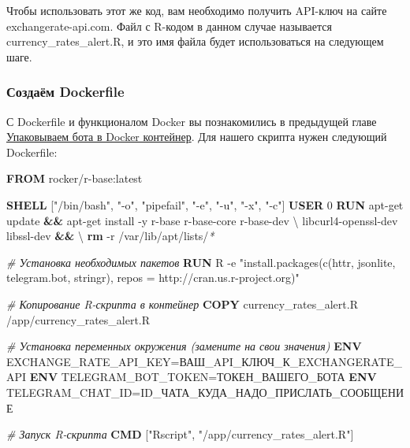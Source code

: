 \documentclass[
]{book}
\newenvironment{Shaded}{\begin{snugshade}}{\end{snugshade}}
\newcommand{\AttributeTok}[1]{\textcolor[rgb]{0.13,0.29,0.53}{#1}}
\newcommand{\CommentTok}[1]{\textcolor[rgb]{0.56,0.35,0.01}{\textit{#1}}}
\newcommand{\DataTypeTok}[1]{\textcolor[rgb]{0.13,0.29,0.53}{#1}}
\newcommand{\ExtensionTok}[1]{#1}
\newcommand{\FunctionTok}[1]{\textcolor[rgb]{0.13,0.29,0.53}{\textbf{#1}}}
\newcommand{\KeywordTok}[1]{\textcolor[rgb]{0.13,0.29,0.53}{\textbf{#1}}}
\newcommand{\NormalTok}[1]{#1}
\newcommand{\PreprocessorTok}[1]{\textcolor[rgb]{0.56,0.35,0.01}{\textit{#1}}}
\newcommand{\StringTok}[1]{\textcolor[rgb]{0.31,0.60,0.02}{#1}}
\begin{document}
Чтобы использовать этот же код, вам необходимо получить API-ключ на сайте exchangerate-api.com. Файл с R-кодом в данном случае называется currency\_rates\_alert.R, и это имя файла будет использоваться на следующем шаге.

\subsubsection{Создаём Dockerfile}\label{ux441ux43eux437ux434ux430ux451ux43c-dockerfile}

С Dockerfile и функционалом Docker вы познакомились в предыдущей главе \hyperref[ux443ux43fux430ux43aux43eux432ux44bux432ux430ux435ux43c-ux431ux43eux442ux430-ux432-docker-ux43aux43eux43dux442ux435ux439ux43dux435ux440]{Упаковываем бота в Docker контейнер}. Для нашего скрипта нужен следующий Dockerfile:

\begin{Shaded}
\begin{Highlighting}[]
\KeywordTok{FROM}\NormalTok{ rocker/r{-}base:latest}

\KeywordTok{SHELL}\NormalTok{ [}\StringTok{"/bin/bash"}\NormalTok{, }\StringTok{"{-}o"}\NormalTok{, }\StringTok{"pipefail"}\NormalTok{, }\StringTok{"{-}e"}\NormalTok{, }\StringTok{"{-}u"}\NormalTok{, }\StringTok{"{-}x"}\NormalTok{, }\StringTok{"{-}c"}\NormalTok{]}
\KeywordTok{USER}\NormalTok{ 0}
\KeywordTok{RUN} \ExtensionTok{apt{-}get}\NormalTok{ update }\KeywordTok{\&\&} \ExtensionTok{apt{-}get}\NormalTok{ install }\AttributeTok{{-}y}\NormalTok{ r{-}base r{-}base{-}core r{-}base{-}dev }\DataTypeTok{\textbackslash{}}
\NormalTok{    libcurl4{-}openssl{-}dev libssl{-}dev }\KeywordTok{\&\&} \DataTypeTok{\textbackslash{}}
    \FunctionTok{rm} \AttributeTok{{-}r}\NormalTok{ /var/lib/apt/lists/}\PreprocessorTok{*}

\CommentTok{\# Установка необходимых пакетов}
\KeywordTok{RUN} \ExtensionTok{R} \AttributeTok{{-}e} \StringTok{"install.packages(c(\textquotesingle{}httr\textquotesingle{}, \textquotesingle{}jsonlite\textquotesingle{}, \textquotesingle{}telegram.bot\textquotesingle{}, \textquotesingle{}stringr\textquotesingle{}), repos = \textquotesingle{}http://cran.us.r{-}project.org\textquotesingle{})"}

\CommentTok{\# Копирование R{-}скрипта в контейнер}
\KeywordTok{COPY}\NormalTok{ currency\_rates\_alert.R /app/currency\_rates\_alert.R}

\CommentTok{\# Установка переменных окружения (замените на свои значения)}
\KeywordTok{ENV}\NormalTok{ EXCHANGE\_RATE\_API\_KEY=ВАШ\_API\_КЛЮЧ\_К\_EXCHANGERATE\_API}
\KeywordTok{ENV}\NormalTok{ TELEGRAM\_BOT\_TOKEN=ТОКЕН\_ВАШЕГО\_БОТА}
\KeywordTok{ENV}\NormalTok{ TELEGRAM\_CHAT\_ID=ID\_ЧАТА\_КУДА\_НАДО\_ПРИСЛАТЬ\_СООБЩЕНИЕ}

\CommentTok{\# Запуск R{-}скрипта}
\KeywordTok{CMD}\NormalTok{ [}\StringTok{"Rscript"}\NormalTok{, }\StringTok{"/app/currency\_rates\_alert.R"}\NormalTok{]}
\end{Highlighting}
\end{Shaded}
\end{document}
